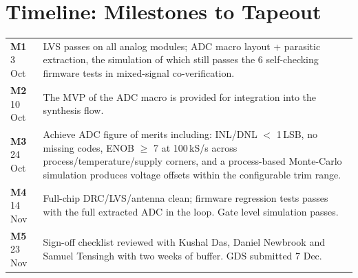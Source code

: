 \documentclass[10pt,a4paper]{article}
\newcommand{\gate}[1]{\textcolor{accent}{\textbf{#1}}}
\begin{document}
\section{Timeline: Milestones to Tapeout}
\begin{center}
\end{center}
\vspace{-6pt}
\begin{tabularx}{\textwidth}{@{}l X@{}}
\gate{M1} 3 Oct & LVS passes on all analog modules; ADC macro layout + parasitic extraction, the simulation of which still passes the 6 self-checking firmware tests in mixed-signal co-verification. \\
\gate{M2} 10 Oct & The MVP of the ADC macro is provided for integration into the synthesis flow. \\
\gate{M3} 24 Oct & Achieve ADC figure of merits including: INL/DNL $<$ 1\,LSB, no missing codes, ENOB $\ge$ 7 at 100\,kS/s across process/temperature/supply corners, and a process-based Monte-Carlo simulation produces voltage offsets within the configurable trim range. \\
\gate{M4} 14 Nov & Full-chip DRC/LVS/antenna clean; firmware regression tests passes with the full extracted ADC in the loop. Gate level simulation passes. \\
\gate{M5} 23 Nov & Sign-off checklist reviewed with Kushal Das, Daniel Newbrook and Samuel Tensingh with two weeks of buffer. GDS submitted 7 Dec. \\
\end{tabularx}
\end{document}
